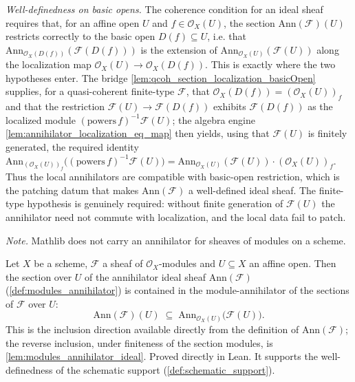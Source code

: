 \begin{definition}
  \emph{Well-definedness on basic opens.} The coherence condition for an ideal
  sheaf requires that, for an affine open \(U\) and \(f \in \mathcal{O}_X(U)\),
  the section \(\mathrm{Ann}(\mathcal{F})(U)\) restricts correctly to the basic
  open \(D(f) \subseteq U\), i.e. that
  \(\mathrm{Ann}_{\mathcal{O}_X(D(f))}(\mathcal{F}(D(f)))\) is the extension of
  \(\mathrm{Ann}_{\mathcal{O}_X(U)}(\mathcal{F}(U))\) along the localization map
  \(\mathcal{O}_X(U) \to \mathcal{O}_X(D(f))\). This is exactly where the two
  hypotheses enter. The bridge
  \cref{lem:qcoh_section_localization_basicOpen} supplies, for a quasi-coherent
  finite-type \(\mathcal{F}\), that \(\mathcal{O}_X(D(f)) = (\mathcal{O}_X(U))_f\)
  and that the restriction \(\mathcal{F}(U) \to \mathcal{F}(D(f))\) exhibits
  \(\mathcal{F}(D(f))\) as the localized module \((\mathrm{powers}\,f)^{-1}
  \mathcal{F}(U)\); the algebra engine
  \cref{lem:annihilator_localization_eq_map} then yields, using that
  \(\mathcal{F}(U)\) is finitely generated, the required identity
  \(\mathrm{Ann}_{(\mathcal{O}_X(U))_f}\bigl((\mathrm{powers}\,f)^{-1}
  \mathcal{F}(U)\bigr) = \mathrm{Ann}_{\mathcal{O}_X(U)}(\mathcal{F}(U)) \cdot
  (\mathcal{O}_X(U))_f\). Thus the local annihilators are compatible with basic-open
  restriction, which is the patching datum that makes \(\mathrm{Ann}(\mathcal{F})\)
  a well-defined ideal sheaf. The finite-type hypothesis is genuinely required:
  without finite generation of \(\mathcal{F}(U)\) the annihilator need not commute
  with localization, and the local data fail to patch.

  \emph{Note.} Mathlib does not carry an annihilator for sheaves of modules on a scheme.
\end{definition}

\begin{lemma}\leanok
  \label{lem:modules_annihilator_ideal_le}
  Let \(X\) be a scheme, \(\mathcal{F}\) a sheaf of \(\mathcal{O}_X\)-modules and
  \(U \subseteq X\) an affine open. Then the section over \(U\) of the annihilator
  ideal sheaf \(\mathrm{Ann}(\mathcal{F})\) (\cref{def:modules_annihilator}) is
  contained in the module-annihilator of the sections of \(\mathcal{F}\) over
  \(U\):
  \[
    \mathrm{Ann}(\mathcal{F})(U)
    \;\subseteq\; \mathrm{Ann}_{\mathcal{O}_X(U)}\bigl(\mathcal{F}(U)\bigr).
  \]
  This is the inclusion direction available directly from the definition of
  \(\mathrm{Ann}(\mathcal{F})\); the reverse inclusion, under finiteness of the
  section modules, is \cref{lem:modules_annihilator_ideal}. Proved directly
  in Lean. It supports the well-definedness of the schematic support
  (\cref{def:schematic_support}).
\end{lemma}

